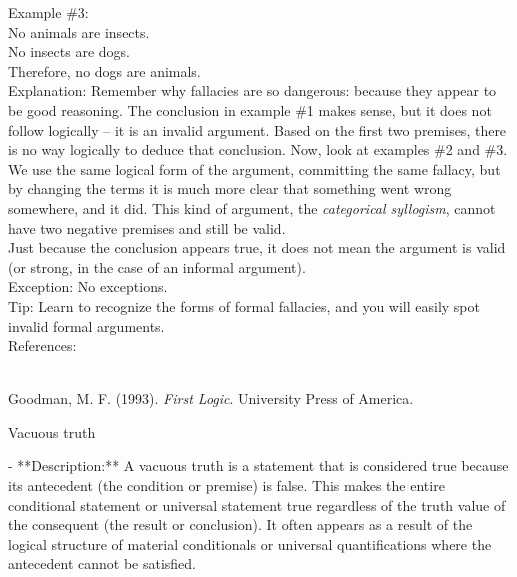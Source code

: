 \documentclass[a4paper,12pt,single,pdftex]{scrbook}
\begin{document}
    
      Example \#3:
    \\

    
      No animals are insects.
    \\

    
      No insects are dogs.
    \\

    
      Therefore, no dogs are animals.
    \\

    
      Explanation: Remember why fallacies are so dangerous: because they appear to be good reasoning.  The conclusion in example \#1 makes sense, but it does not follow logically -- it is an invalid argument.  Based on the first two premises, there is no way logically to deduce that conclusion.  Now, look at examples \#2 and \#3.  We use the same logical form of the argument, committing the same fallacy, but by changing the terms it is much more clear that something went wrong somewhere, and it did.  This kind of argument, the {\it categorical syllogism}, cannot have two negative premises and still be valid.
    \\

    
      Just because the conclusion appears true, it does not mean the argument is valid (or strong, in the case of an informal argument).
    \\

    
      Exception: No exceptions.
    \\

    
      Tip: Learn to recognize the forms of formal fallacies, and you will easily spot invalid formal arguments.
    \\

    References:

    
      
        
      \\

      
        
          Goodman, M. F. (1993). {\it First Logic}. University Press of America.
        
      
    
  

Vacuous truth
    
      - **Description:** A vacuous truth is a statement that is considered true because its antecedent (the condition or premise) is false. This makes the entire conditional statement or universal statement true regardless of the truth value of the consequent (the result or conclusion). It often appears as a result of the logical structure of material conditionals or universal quantifications where the antecedent cannot be satisfied.
    \\
\end{document}
